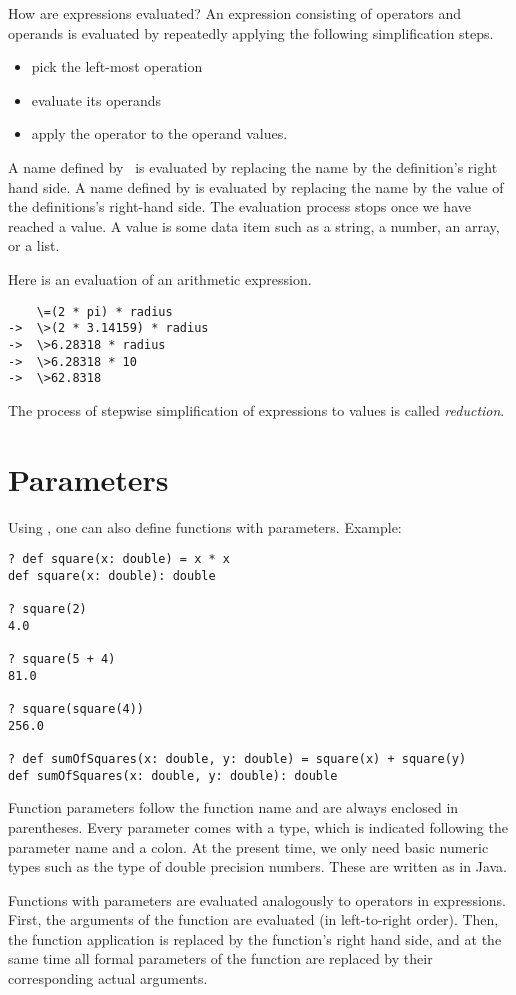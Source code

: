 \documentclass[11pt]{book}
\begin{document}
How are expressions evaluated? An expression consisting of operators
and operands is evaluated by repeatedly applying the following
simplification steps.
\begin{itemize}
\item pick the left-most operation
\item evaluate its operands
\item apply the operator to the operand values.
\end{itemize}
A name defined by \verb@def@\ is evaluated by replacing the name by the
definition's right hand side. A name defined by \verb@val@ is
evaluated by replacing the name by the value of the definitions's
right-hand side.  The evaluation process stops once we have reached a
value. A value is some data item such as a string, a number, an array,
or a list.

\example
Here is an evaluation of an arithmetic expression.
\begin{verbatim}
    \=(2 * pi) * radius
->  \>(2 * 3.14159) * radius
->  \>6.28318 * radius
->  \>6.28318 * 10
->  \>62.8318
\end{verbatim}
The process of stepwise simplification of expressions to values is
called {\em reduction}.

\section{Parameters}

Using \verb@def@, one can also define functions with parameters. Example:
\begin{verbatim}
? def square(x: double) = x * x
def square(x: double): double

? square(2)
4.0

? square(5 + 4)
81.0

? square(square(4))
256.0

? def sumOfSquares(x: double, y: double) = square(x) + square(y)
def sumOfSquares(x: double, y: double): double
\end{verbatim}

Function parameters follow the function name and are always enclosed
in parentheses.  Every parameter comes with a type, which is indicated
following the parameter name and a colon. At the present time, we only
need basic numeric types such as the type \verb@double@ of double
precision numbers. These are written as in Java.

Functions with parameters are evaluated analogously to operators in
expressions. First, the arguments of the function are evaluated (in
left-to-right order). Then, the function application is replaced by
the function's right hand side, and at the same time all formal
parameters of the function are replaced by their corresponding actual
arguments.
\end{document}
